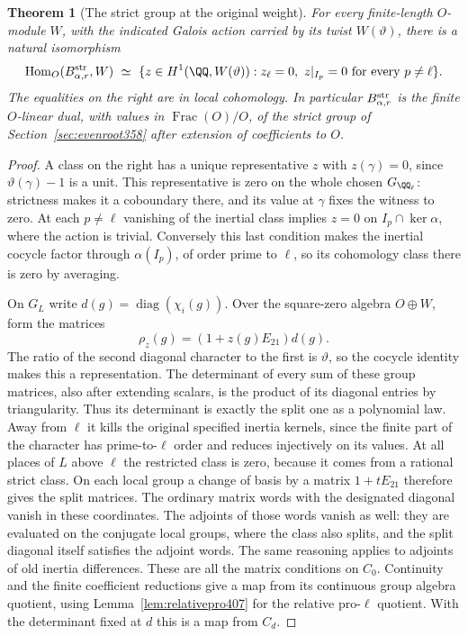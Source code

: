 \documentclass[a4paper,11pt]{article}
\newtheorem{theorem}[proposition]{Theorem}
\theoremstyle{definition}
\theoremstyle{remark}
\numberwithin{equation}{section}
\begin{document}
\begin{theorem}[The strict group at the original weight]\leavevmode
\label{thm:strictcorner415}
For every finite-length \(O\)-module \(W\), with the indicated
Galois action carried by its twist \(W(\vartheta)\), there
is a natural isomorphism
\[
  \operatorname{Hom}_O(B_{\alpha,r}^{\rm str},W)
   \ \simeq\
   \{z\in H^1(\QQ,W(\vartheta)):
          z_\ell=0,\ z|_{I_p}=0\ \text{for every }p\ne\ell\}.
\]
The equalities on the right are in local cohomology.
In particular \(B_{\alpha,r}^{\rm str}\) is the finite
\(O\)-linear dual, with values in \(\operatorname{Frac}(O)/O\),
of the strict group of Section~\ref{sec:evenroot358} after
extension of coefficients to \(O\).
\end{theorem}
\begin{proof}
A class on the right has a unique representative \(z\)
with \(z(\gamma)=0\), since \(\vartheta(\gamma)-1\) is a
unit. This representative is zero on the whole chosen
\(G_{\QQ_\ell}\): strictness makes it a coboundary there,
and its value at \(\gamma\) fixes the witness to zero.
At each \(p\ne\ell\) vanishing of the inertial class implies
\(z=0\) on \(I_p\cap\ker\alpha\), where the action is
trivial. Conversely this last condition makes the inertial
cocycle factor through \(\alpha(I_p)\), of order prime to
\(\ell\), so its cohomology class there is zero by averaging.

On \(G_L\) write \(d(g)=\operatorname{diag}(\chi_i(g))\).
Over the square-zero algebra \(O\oplus W\), form the matrices
\[
           \rho_z(g)=(1+z(g)E_{21})d(g).
\]
The ratio of the second diagonal character to the first
is \(\vartheta\), so the cocycle identity makes this a
representation. The determinant of every sum of these
group matrices, also after extending scalars, is the
product of its diagonal entries by triangularity. Thus
its determinant is exactly the split one as a polynomial
law. Away from \(\ell\) it kills the original specified
inertia kernels, since the finite part of the character
has prime-to-\(\ell\) order and reduces injectively on its
values. At all places of \(L\) above \(\ell\) the restricted
class is zero, because it comes from a rational strict
class. On each local group a change of basis by a matrix
\(1+t E_{21}\) therefore gives the split matrices. The ordinary matrix
words with the designated diagonal vanish in these
coordinates. The adjoints of those words vanish as well:
they are evaluated on the conjugate local groups, where
the class also splits, and the split diagonal itself
satisfies the adjoint words. The same reasoning applies
to adjoints of old inertia differences. These are all the
matrix conditions on \(C_0\). Continuity and the finite
coefficient reductions give a map from its continuous
group algebra quotient, using Lemma~\ref{lem:relativepro407}
for the relative pro-\(\ell\) quotient. With the determinant
fixed at \(d\) this is a map from \(C_d\).


\end{proof}
\end{document}

